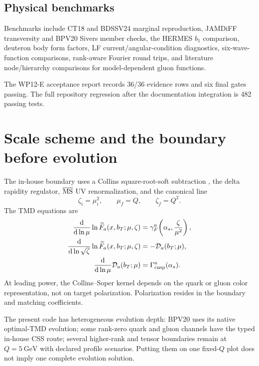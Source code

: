 \documentclass[11pt]{article}
\newcommand{\dd}{\mathrm{d}}
\begin{document}
\subsection{Physical benchmarks}

Benchmarks include CT18 and BDSSV24 marginal reproduction, JAMDiFF
transversity and BPV20 Sivers member checks, the HERMES \(b_1\) comparison,
deuteron body form factors, LF current/angular-condition diagnostics,
six-wave-function comparisons, rank-aware Fourier round trips, and
literature node/hierarchy comparisons for model-dependent gluon functions.

The WP12-E acceptance report records 36/36 evidence rows and six final
gates passing.  The full repository regression after the documentation
integration is 482 passing tests.

\section{Scale scheme and the boundary before evolution}
\label{sec:evolution}

The in-house boundary uses a Collins square-root-soft subtraction
\cite{Collins,EIS}, the
delta rapidity regulator, \(\overline{\rm MS}\) UV renormalization, and the
canonical line
\begin{equation}
\zeta_i=\mu_i^2,\qquad
\mu_f=Q,\qquad \zeta_f=Q^2.
\label{eq:scale-line}
\end{equation}
The TMD equations are
\begin{align}
\frac{\dd}{\dd\ln\mu}\ln\widetilde F_a(x,b_T;\mu,\zeta)
 &=\gamma_F^a\!\left(\alpha_s,\frac{\zeta}{\mu^2}\right),\\
\frac{\dd}{\dd\ln\sqrt{\zeta}}\ln\widetilde F_a(x,b_T;\mu,\zeta)
 &=-\mathcal D_a(b_T;\mu),\\
\frac{\dd}{\dd\ln\mu}\mathcal D_a(b_T;\mu)
 &=\Gamma_{\rm cusp}^a(\alpha_s).
\label{eq:evolution}
\end{align}
At leading power, the Collins--Soper kernel depends on the quark or gluon
color representation, not on target polarization.  Polarization resides
in the boundary and matching coefficients.

The present code has heterogeneous evolution depth: BPV20 uses its native
optimal-TMD evolution; some rank-zero quark and gluon channels have the
typed in-house CSS route; several higher-rank and tensor boundaries remain
at \(Q=5~\mathrm{GeV}\) with declared profile scenarios.  Putting them on
one fixed-\(Q\) plot does not imply one complete evolution solution.
\end{document}
